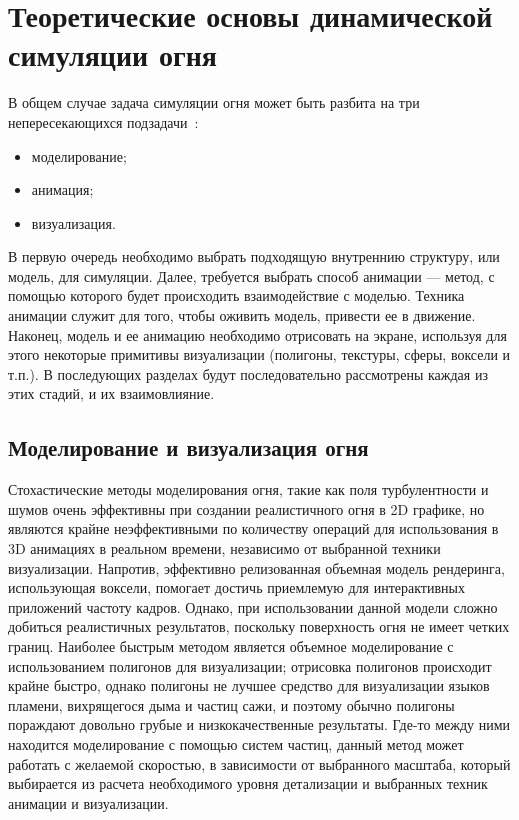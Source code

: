 \chapter{Теоретические основы динамической симуляции огня}

В общем случае задача симуляции огня может быть разбита на три
непересекающихся подзадачи~\cite{Perry94synthesizingflames}:
\begin{itemize}
	\item моделирование;
	\item анимация;
	\item визуализация.
\end{itemize}

В первую очередь необходимо выбрать подходящую внутреннию структуру, или модель,
для симуляции. Далее, требуется выбрать способ анимации --- метод, с помощью
которого будет происходить взаимодействие с моделью. Техника анимации служит для
того, чтобы оживить модель, привести ее в движение. Наконец, модель и ее
анимацию необходимо отрисовать на экране, используя для этого некоторые
примитивы визуализации (полигоны, текстуры, сферы, воксели и т.п.). В
последующих разделах будут последовательно рассмотрены каждая из этих стадий, и
их взаимовлияние.

\section{Моделирование и визуализация огня}
Стохастические методы моделирования огня, такие как поля турбулентности и шумов
очень эффективны при создании реалистичного огня в 2D графике, но являются
крайне неэффективными по количеству операций для использования в 3D анимациях в
реальном времени, независимо от выбранной техники визуализации. Напротив,
эффективно релизованная объемная модель рендеринга, использующая воксели,
помогает достичь приемлемую для интерактивных приложений частоту кадров. Однако, при
использовании данной модели сложно добиться реалистичных результатов, поскольку
поверхность огня не имеет четких границ. Наиболее быстрым методом является
объемное моделирование с использованием полигонов для визуализации; отрисовка
полигонов происходит крайне быстро, однако полигоны не лучшее средство для
визуализации языков пламени, вихрящегося дыма и частиц сажи, и поэтому обычно полигоны
пораждают довольно грубые и низкокачественные результаты. Где-то между ними
находится моделирование с помощью систем частиц, данный метод может работать с
желаемой скоростью, в зависимости от выбранного масштаба, который выбирается из
расчета необходимого уровня детализации и выбранных техник анимации и
визуализации.
